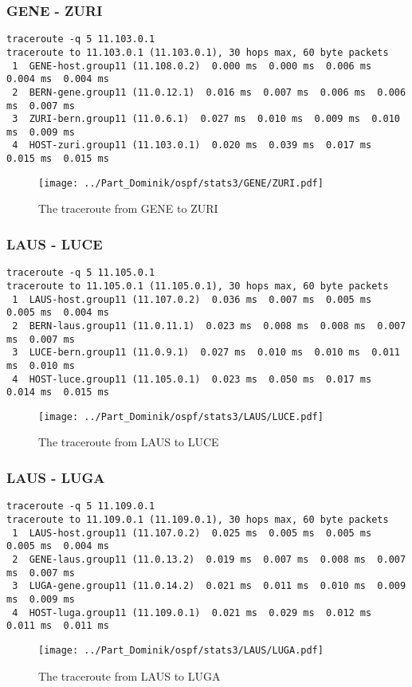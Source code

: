 \subsubsection{GENE - ZURI}
\begin{lstlisting}
traceroute -q 5 11.103.0.1
traceroute to 11.103.0.1 (11.103.0.1), 30 hops max, 60 byte packets
 1  GENE-host.group11 (11.108.0.2)  0.000 ms  0.000 ms  0.006 ms  0.004 ms  0.004 ms
 2  BERN-gene.group11 (11.0.12.1)  0.016 ms  0.007 ms  0.006 ms  0.006 ms  0.007 ms
 3  ZURI-bern.group11 (11.0.6.1)  0.027 ms  0.010 ms  0.009 ms  0.010 ms  0.009 ms
 4  HOST-zuri.group11 (11.103.0.1)  0.020 ms  0.039 ms  0.017 ms  0.015 ms  0.015 ms
\end{lstlisting}
\begin{figure}[H]
\centering
\texttt{[image: ../Part\_Dominik/ospf/stats3/GENE/ZURI.pdf]}
\caption{The traceroute from GENE to ZURI}
\end{figure}
\clearpage
\subsubsection{LAUS - LUCE}
\begin{lstlisting}
traceroute -q 5 11.105.0.1
traceroute to 11.105.0.1 (11.105.0.1), 30 hops max, 60 byte packets
 1  LAUS-host.group11 (11.107.0.2)  0.036 ms  0.007 ms  0.005 ms  0.005 ms  0.004 ms
 2  BERN-laus.group11 (11.0.11.1)  0.023 ms  0.008 ms  0.008 ms  0.007 ms  0.007 ms
 3  LUCE-bern.group11 (11.0.9.1)  0.027 ms  0.010 ms  0.010 ms  0.011 ms  0.010 ms
 4  HOST-luce.group11 (11.105.0.1)  0.023 ms  0.050 ms  0.017 ms  0.014 ms  0.015 ms
\end{lstlisting}
\begin{figure}[H]
\centering
\texttt{[image: ../Part\_Dominik/ospf/stats3/LAUS/LUCE.pdf]}
\caption{The traceroute from LAUS to LUCE}
\end{figure}
\clearpage
\subsubsection{LAUS - LUGA}
\begin{lstlisting}
traceroute -q 5 11.109.0.1
traceroute to 11.109.0.1 (11.109.0.1), 30 hops max, 60 byte packets
 1  LAUS-host.group11 (11.107.0.2)  0.025 ms  0.005 ms  0.005 ms  0.005 ms  0.004 ms
 2  GENE-laus.group11 (11.0.13.2)  0.019 ms  0.007 ms  0.008 ms  0.007 ms  0.007 ms
 3  LUGA-gene.group11 (11.0.14.2)  0.021 ms  0.011 ms  0.010 ms  0.009 ms  0.009 ms
 4  HOST-luga.group11 (11.109.0.1)  0.021 ms  0.029 ms  0.012 ms  0.011 ms  0.011 ms
\end{lstlisting}
\begin{figure}[H]
\centering
\texttt{[image: ../Part\_Dominik/ospf/stats3/LAUS/LUGA.pdf]}
\caption{The traceroute from LAUS to LUGA}
\end{figure}
\clearpage
